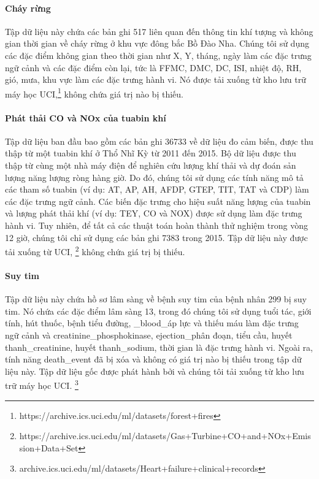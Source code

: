 \paragraph{Cháy rừng} Tập dữ liệu này chứa các bản ghi 517 liên quan đến thông tin khí tượng và không gian thời gian về cháy rừng ở khu vực đông bắc Bồ Đào Nha. Chúng tôi sử dụng các đặc điểm không gian theo thời gian như X, Y, tháng, ngày làm các đặc trưng ngữ cảnh và các đặc điểm còn lại, tức là FFMC, DMC, DC, ISI, nhiệt độ, RH, gió, mưa, khu vực làm các đặc trưng hành vi. Nó được tải xuống từ kho lưu trữ máy học UCI,\footnote{https://archive.ics.uci.edu/ml/datasets/forest+fires} không chứa giá trị nào bị thiếu.

\paragraph{Phát thải CO và NOx của tuabin khí } Tập dữ liệu ban đầu bao gồm các bản ghi 36733 về dữ liệu đo cảm biến, được thu thập từ một tuabin khí ở Thổ Nhĩ Kỳ từ 2011 đến 2015. Bộ dữ liệu được thu thập từ cùng một nhà máy điện để nghiên cứu lượng khí thải và dự đoán sản lượng năng lượng ròng hàng giờ. Do đó, chúng tôi sử dụng các tính năng mô tả các tham số tuabin (ví dụ: AT, AP, AH, AFDP, GTEP, TIT, TAT và CDP) làm các đặc trưng ngữ cảnh.
Các biến đặc trưng cho hiệu suất năng lượng của tuabin và lượng phát thải khí (ví dụ: TEY, CO và NOX) được sử dụng làm đặc trưng hành vi. Tuy nhiên, để tất cả các thuật toán hoàn thành thử nghiệm trong vòng 12 giờ, chúng tôi chỉ sử dụng các bản ghi 7383 trong 2015. Tập dữ liệu này được tải xuống từ UCI, \footnote{https://archive.ics.uci.edu/ml/datasets/Gas+Turbine+CO+and+NOx+Emission+Data+Set} không chứa giá trị bị thiếu.


\paragraph{Suy tim}
Tập dữ liệu này chứa hồ sơ lâm sàng về bệnh suy tim của bệnh nhân 299 bị suy tim. Nó chứa các đặc điểm lâm sàng 13, trong đó chúng tôi sử dụng tuổi tác, giới tính, hút thuốc, bệnh tiểu đường, \_blood\_áp lực và thiếu máu làm đặc trưng ngữ cảnh và creatinine\_phosphokinase, ejection\_phân đoạn, tiểu cầu, huyết thanh\_creatinine, huyết thanh\_sodium, thời gian là đặc trưng hành vi. Ngoài ra, tính năng death\_event đã bị xóa và không có giá trị nào bị thiếu trong tập dữ liệu này. Tập dữ liệu gốc được phát hành bởi \cite{ahmad2017survival} và chúng tôi tải xuống từ kho lưu trữ máy học UCI. \footnote{archive.ics.uci.edu/ml/datasets/Heart+failure+clinical+records}

